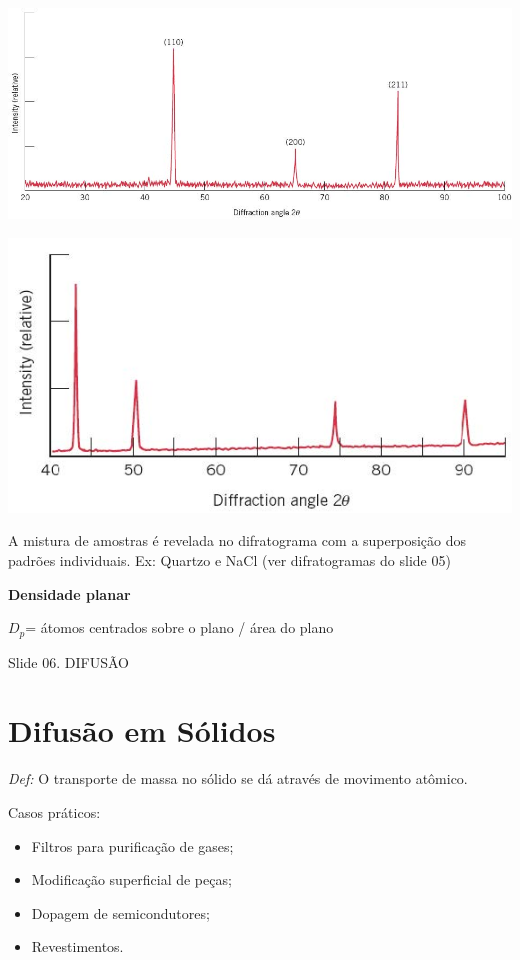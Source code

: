\includegraphics[scale=0.4,trim={0 0 0 0}]{figures/difraFe}

\includegraphics[scale=0.4,trim={0 0 0 0}]{figures/difraCu}

A mistura de amostras é revelada no difratograma com a superposição dos padrões individuais. Ex: Quartzo e NaCl (ver difratogramas do slide 05)


\textbf{Densidade planar}

$D_{p}$= átomos centrados sobre o plano / área do plano


{\large Slide 06. DIFUSÃO}


\section{Difusão em Sólidos}

\textit{Def:} O transporte de massa no sólido se dá através de movimento atômico.

Casos práticos:

\begin{itemize}
	\item Filtros para purificação de gases;
	\item Modificação superficial de peças;
	\item Dopagem de semicondutores;
	\item Revestimentos.
\end{itemize}



